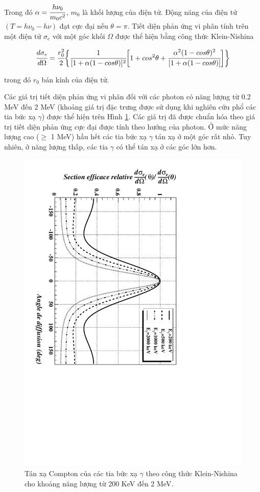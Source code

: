 Trong đó $\alpha=\cfrac{h\nu_{0}}{m_{0}c^{2}}$, $m_{0}$ là khối lượng của điện tử. Động năng của điện tử $(T=h\nu_{0}-h\nu)$ đạt cực đại nếu $\theta=\pi$. Tiết diện phản ứng vi phân tính trên một điện tử $\sigma_{e}$  với một góc khối $\Omega$ được thể hiện bằng công thức Klein-Nishina\cite{bib_Klein}

\begin{equation}
\cfrac{d \sigma_{e}}{d \Omega} = \cfrac{r_{0}^{2}}{2} 
\biggl\{
\cfrac{1}{[1+\alpha(1-cos\theta)]^{2}}
\biggl [
1+cos^{2}\theta+\cfrac{\alpha^{2}(1-cos\theta)^{2}}{[1+\alpha(1-cos\theta)]}
\biggr ]
\biggr\}
\end{equation}

trong đó $r_{0}$ bán kính của điện tử. 

Các giá trị tiết diện phản ứng vi phân đối với các photon có năng lượng từ 0.2 MeV đến 2 MeV (khoảng giá trị đặc trưng được sử dụng khi nghiên cứu phổ các tia bức xạ $\gamma$) được thể hiện trên Hình \ref{fig:klein}. Các giá trị đã được chuẩn hóa theo giá trị tiết diện phản ứng cực đại được tính theo hướng của photon. Ở mức năng lượng cao ($\geq$ 1 MeV) hầu hết các tia bức xạ $\gamma$ tán xạ ở một góc rất nhỏ. Tuy nhiên, ở năng lượng thấp, các tia $\gamma$ có thể tán xạ ở các góc lớn hơn. 

\begin{figure}[!h]
\centering
\includegraphics[height=0.8\textwidth,angle = 90.0 ]{figure/fig_cosolythuyet/klein.pdf}
\caption{Tán xạ Compton của các tia bức xạ $\gamma$ theo công thức Klein-Nishina cho khoảng năng lượng từ 200 KeV đến 2 MeV.}
\label{fig:klein}
\end{figure}

